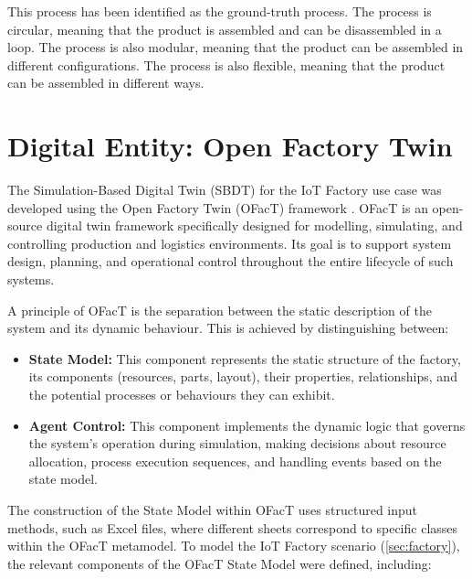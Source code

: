 This process has been identified as the ground-truth process. The process is circular, meaning that the product is assembled and can be disassembled in a loop. The process is also modular, meaning that the product can be assembled in different configurations. The process is also flexible, meaning that the product can be assembled in different ways.
\section{Digital Entity: Open Factory Twin}
\label{sec:automated-digital-twin}

The Simulation-Based Digital Twin (SBDT) for the IoT Factory use case was developed using the Open Factory Twin (OFacT) framework \autocite{ofact-intern}. OFacT is an open-source digital twin framework specifically designed for modelling, simulating, and controlling production and logistics environments. Its goal is to support system design, planning, and operational control throughout the entire lifecycle of such systems.

A principle of OFacT is the separation between the static description of the system and its dynamic behaviour. This is achieved by distinguishing between:

\begin{itemize}
  \item \textbf{State Model:} This component represents the static structure of the factory, its components (resources, parts, layout), their properties, relationships, and the potential processes or behaviours they can exhibit.
  \item \textbf{Agent Control:} This component implements the dynamic logic that governs the system's operation during simulation, making decisions about resource allocation, process execution sequences, and handling events based on the state model.
\end{itemize}

The construction of the State Model within OFacT uses structured input methods, such as Excel files, where different sheets correspond to specific classes within the OFacT metamodel. To model the IoT Factory scenario (\autoref{sec:factory}), the relevant components of the OFacT State Model were defined, including:

